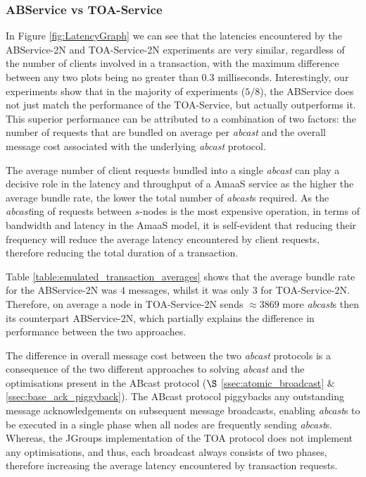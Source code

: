     \subsubsection*{ABService vs TOA-Service}
    In Figure \ref{fig:LatencyGraph} we can see that the latencies encountered by the ABService-2N and TOA-Service-2N experiments are very similar, regardless of the number of clients involved in a transaction, with the maximum difference between any two plots being no greater than $0.3$ milliseconds.  Interestingly, our experiments show that in the majority of experiments ($5/8$), the ABService does not just match the performance of the TOA-Service, but actually outperforms it.  This superior performance can be attributed to a combination of two factors: the number of requests that are bundled on average per \emph{abcast} and the overall message cost associated with the underlying \emph{abcast} protocol.  
    
    The average number of client requests bundled into a single \emph{abcast} can play a decisive role in the latency and throughput of a \textsf{AmaaS} service as the higher the average bundle rate, the lower the total number of \emph{abcast}s required.  As the \emph{abcast}ing of requests between $s$-nodes is the most expensive operation, in terms of bandwidth and latency in the \textsf{AmaaS} model, it is self-evident that reducing their frequency will reduce the average latency encountered by client requests, therefore reducing the total duration of a transaction.  
    
    Table \ref{table:emulated_transaction_averages} shows that the average bundle rate for the ABService-2N was $4$ messages, whilst it was only $3$ for TOA-Service-2N.  Therefore, on average a node in TOA-Service-2N sends $\approx 3869$ more \emph{abcast}s then its counterpart ABService-2N, which partially explains the difference in performance between the two approaches.  
    
    The difference in overall message cost between the two \emph{abcast} protocols is a consequence of the two different approaches to solving \emph{abcast} and the optimisations present in the \textsf{ABcast} protocol ($\S$  \ref{ssec:atomic_broadcast} $\&$ \ref{ssec:base_ack_piggyback}).  The \textsf{ABcast} protocol piggybacks any outstanding message acknowledgements on subsequent message broadcasts, enabling \emph{abcast}s to be executed in a single phase when all nodes are frequently sending \emph{abcast}s.  Whereas, the JGroups implementation of the TOA protocol does not implement any optimisations, and thus, each broadcast always consists of two phases, therefore increasing the average latency encountered by transaction requests.  
	

